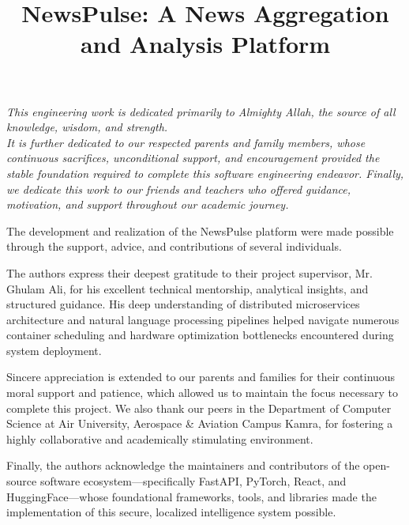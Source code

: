 \documentclass{air-kamra-bs}
\title{NewsPulse: A News Aggregation and Analysis Platform}
\begin{document}
\begin{dedication}
    \begin{center}
        \textit{This engineering work is dedicated primarily to Almighty Allah, the source of all knowledge, wisdom, and strength.}\\ \vspace{0.5cm}
        \textit{It is further dedicated to our respected parents and family members, whose continuous sacrifices, unconditional support, and encouragement provided the stable foundation required to complete this software engineering endeavor. Finally, we dedicate this work to our friends and teachers who offered guidance, motivation, and support throughout our academic journey.}
    \end{center}
\end{dedication}

\begin{acknowledgements}
    The development and realization of the NewsPulse platform were made possible through the support, advice, and contributions of several individuals. 

    The authors express their deepest gratitude to their project supervisor, Mr. Ghulam Ali, for his excellent technical mentorship, analytical insights, and structured guidance. His deep understanding of distributed microservices architecture and natural language processing pipelines helped navigate numerous container scheduling and hardware optimization bottlenecks encountered during system deployment.

    Sincere appreciation is extended to our parents and families for their continuous moral support and patience, which allowed us to maintain the focus necessary to complete this project. We also thank our peers in the Department of Computer Science at Air University, Aerospace \& Aviation Campus Kamra, for fostering a highly collaborative and academically stimulating environment.

    Finally, the authors acknowledge the maintainers and contributors of the open-source software ecosystem—specifically FastAPI, PyTorch, React, and HuggingFace—whose foundational frameworks, tools, and libraries made the implementation of this secure, localized intelligence system possible.
\end{acknowledgements}
\end{document}
